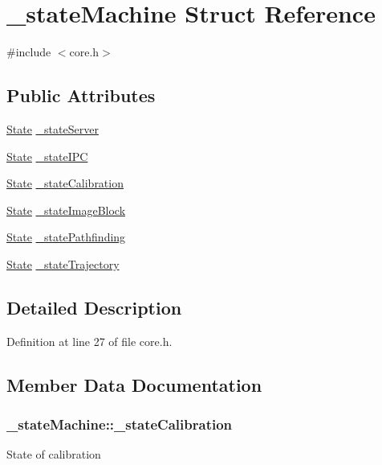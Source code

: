 \hypertarget{struct__state_machine}{\section{\-\_\-state\-Machine Struct Reference}
\label{struct__state_machine}
}


{\ttfamily \#include $<$core.\-h$>$}

\subsection*{Public Attributes}
\begin{DoxyCompactItemize}
\item 
\hyperlink{core_8h_a5d74787dedbc4e11c1ab15bf487e61f8}{State} \hyperlink{struct__state_machine_aaee24e4ab99a6f1243a46645188de8d0}{\-\_\-state\-Server}
\item 
\hyperlink{core_8h_a5d74787dedbc4e11c1ab15bf487e61f8}{State} \hyperlink{struct__state_machine_aa6cc70d0567b403fb9e993a681f48b85}{\-\_\-state\-I\-P\-C}
\item 
\hyperlink{core_8h_a5d74787dedbc4e11c1ab15bf487e61f8}{State} \hyperlink{struct__state_machine_a157036ced733a021849ebcbc98c27200}{\-\_\-state\-Calibration}
\item 
\hyperlink{core_8h_a5d74787dedbc4e11c1ab15bf487e61f8}{State} \hyperlink{struct__state_machine_adbc0e51d4bed9b6da5c44e921e37dc32}{\-\_\-state\-Image\-Block}
\item 
\hyperlink{core_8h_a5d74787dedbc4e11c1ab15bf487e61f8}{State} \hyperlink{struct__state_machine_a79ce614ae01c3759d155c03026384ca7}{\-\_\-state\-Pathfinding}
\item 
\hyperlink{core_8h_a5d74787dedbc4e11c1ab15bf487e61f8}{State} \hyperlink{struct__state_machine_a88c6e0c15cdd29b3eec2e842fa09b08f}{\-\_\-state\-Trajectory}
\end{DoxyCompactItemize}


\subsection{Detailed Description}


Definition at line 27 of file core.\-h.



\subsection{Member Data Documentation}
\hypertarget{struct__state_machine_a157036ced733a021849ebcbc98c27200}{
\subsubsection[{\-\_\-state\-Calibration}]{ \-\_\-state\-Machine\-::\-\_\-state\-Calibration}}\label{struct__state_machine_a157036ced733a021849ebcbc98c27200}
State of calibration 

